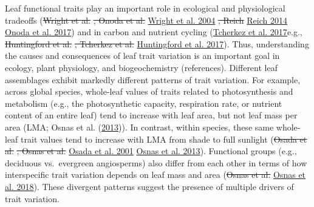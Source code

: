 \documentclass[
  12pt,
]{article}
\providecommand{\DIFaddtex}[1]{{\protect\color{blue}\uwave{#1}}} %
\providecommand{\DIFdeltex}[1]{{\protect\color{red}\sout{#1}}}                      %
\providecommand{\DIFaddbegin}{} %
\providecommand{\DIFaddend}{} %
\providecommand{\DIFdelbegin}{} %
\providecommand{\DIFdelend}{} %
\providecommand{\DIFadd}[1]{\texorpdfstring{\DIFaddtex{#1}}{#1}} %
\providecommand{\DIFdel}[1]{\texorpdfstring{\DIFdeltex{#1}}{}} %
\newcommand{\DIFscaledelfig}{0.5}
\newlength{\DIFdelgraphicswidth} %
\newlength{\DIFdelgraphicsheight} %
\newcommand{\DIFaddincludegraphics}[2][]{{\color{blue}\fbox{\DIFOincludegraphics[#1]{#2}}}} %
\newcommand{\DIFdelincludegraphics}[2][]{%
\sbox{\DIFdelgraphicsbox}{\DIFOincludegraphics[#1]{#2}}%
\settoboxwidth{\DIFdelgraphicswidth}{\DIFdelgraphicsbox} %
\settoboxtotalheight{\DIFdelgraphicsheight}{\DIFdelgraphicsbox} %
\scalebox{\DIFscaledelfig}{%
\parbox[b]{\DIFdelgraphicswidth}{\usebox{\DIFdelgraphicsbox}\\[-\baselineskip] \rule{\DIFdelgraphicswidth}{0em}}\llap{\resizebox{\DIFdelgraphicswidth}{\DIFdelgraphicsheight}{%
\setlength{\unitlength}{\DIFdelgraphicswidth}%
\begin{picture}(1,1)%
\thicklines\linethickness{2pt} %
{\color[rgb]{1,0,0}\put(0,0){\framebox(1,1){}}}%
{\color[rgb]{1,0,0}\put(0,0){\line( 1,1){1}}}%
{\color[rgb]{1,0,0}\put(0,1){\line(1,-1){1}}}%
\end{picture}%
}\hspace*{3pt}}} %
} %
\DeclareRobustCommand{\DIFaddbegin}{\DIFOaddbegin \let\includegraphics\DIFaddincludegraphics} %
\DeclareRobustCommand{\DIFaddend}{\DIFOaddend \let\includegraphics\DIFOincludegraphics} %
\DeclareRobustCommand{\DIFdelbegin}{\DIFOdelbegin \let\includegraphics\DIFdelincludegraphics} %
\DeclareRobustCommand{\DIFdelend}{\DIFOaddend \let\includegraphics\DIFOincludegraphics} %
\begin{document}
Leaf functional traits play an important role in ecological and physiological tradeoffs (\DIFdelbegin \DIFdel{Wright et al. }\DIFdelend \protect\DIFdelbegin %
\DIFdel{, Onoda et al. }\DIFdelend \DIFaddbegin \hyperlink{ref-Wright2004a}{Wright et al. 2004}\DIFadd{, }\DIFaddend \protect\DIFdelbegin %
\DIFdel{, Reich }\DIFdelend \DIFaddbegin \hyperlink{ref-Reich2014}{Reich 2014}\DIFadd{, }\DIFaddend \protect\DIFdelbegin %
\DIFdelend \DIFaddbegin \hyperlink{ref-Onoda2017}{Onoda et al. 2017}\DIFaddend ) and in carbon and nutrient cycling (\DIFaddbegin \protect\hyperlink{ref-Tcherkez2017}{Tcherkez et al. 2017}\DIFadd{, }\DIFaddend e.g., \DIFdelbegin \DIFdel{Huntingford et al. }\DIFdelend \protect\DIFdelbegin %
\DIFdel{, Tcherkez et al. }%
\DIFdelend \DIFaddbegin \hyperlink{ref-Huntingford2017}{Huntingford et al. 2017}\DIFaddend ).
Thus, understanding the causes and consequences of leaf trait variation is an important goal in ecology, plant physiology, and biogeochemistry (references).
Different leaf assemblages exhibit markedly different patterns of trait variation.
For example, across global species, whole-leaf values of traits related to photosynthesis and metabolism (e.g., the photosynthetic capacity, respiration rate, or nutrient content of an entire leaf) tend to increase with leaf area, but not leaf mass per area (LMA; Osnas et al. (\protect\hyperlink{ref-Osnas2013}{2013})). In contrast, within species, these same whole-leaf trait values tend to increase with LMA from shade to full sunlight (\DIFdelbegin \DIFdel{Osada et al. }\DIFdelend \protect\DIFdelbegin %
\DIFdel{, Osnas et al. }\DIFdelend \DIFaddbegin \hyperlink{ref-Osada2001}{Osada et al. 2001}\DIFadd{, }\DIFaddend \protect\DIFdelbegin %
\DIFdelend \DIFaddbegin \hyperlink{ref-Osnas2013}{Osnas et al. 2013}\DIFaddend ).
Functional groups (e.g., deciduous vs.~evergreen angiosperms) also differ from each other in terms of how interspecific trait variation depends on leaf mass and area (\DIFdelbegin \DIFdel{Osnas et al. }\DIFdelend \protect\DIFdelbegin %
\DIFdelend \DIFaddbegin \hyperlink{ref-Osnas2018}{Osnas et al. 2018}\DIFaddend ).
These divergent patterns suggest the presence of multiple drivers of trait variation.
\end{document}
